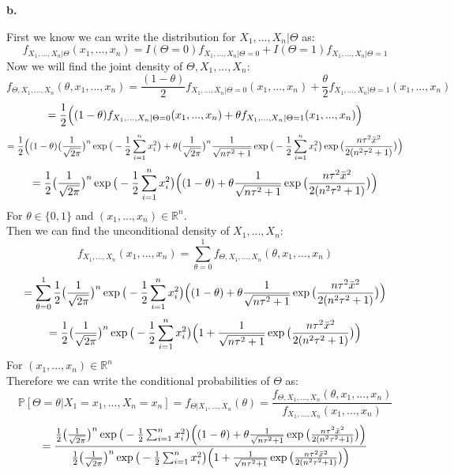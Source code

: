 \documentclass{article}
\begin{document}
\newpage
{\Large\textbf{b.}}
\begin{center}
\doublespacing
    First we know we can write the distribution for $X_1, ..., X_n |\Theta$ as:
    \[f_{X_1, ..., X_n |\Theta} (x_1, ..., x_n) = I(\Theta = 0) f_{X_1, ..., X_n |\Theta = 0} + I(\Theta = 1) f_{X_1, ..., X_n |\Theta = 1}\]
    Now we will find the joint density of $\Theta, X_1, ..., X_n$:
    \[f_{\Theta, X_1, ..., X_n} (\theta, x_1, ..., x_n) = \frac{(1 -\theta)}{2} f_{X_1, ..., X_n |\Theta = 0} (x_1, ..., x_n) +\frac{\theta}{2} f_{X_1, ..., X_n |\Theta = 1} (x_1, ..., x_n)\]
    \[=\frac{1}{2}\Big{(}(1 -\theta) f_{X_1, ..., X_n |\Theta = 0} (x_1, ..., x_n) +\theta f_{X_1, ..., X_n |\Theta = 1} (x_1, ..., x_n)\Big{)}\]
    \[=\frac{1}{2}\Big{(}(1 -\theta)\big{(}\frac{1}{\sqrt{2\pi}}\big{)}^n\exp{\big{(}-\frac{1}{2}\sum_{i=1}^n x_i^2\big{)}} +\theta\big{(}\frac{1}{\sqrt{2\pi}}\big{)}^n\frac{1}{\sqrt{n\tau^2 + 1}}\exp{\big{(}-\frac{1}{2}\sum_{i=1}^n x_i^2\big{)}}\exp{\big{(}\frac{n\tau^2\Bar{x}^2}{2(n^2\tau^2 + 1)}\big{)}}\Big{)}\]
    \[=\frac{1}{2}\big{(}\frac{1}{\sqrt{2\pi}}\big{)}^n\exp{\big{(}-\frac{1}{2}\sum_{i=1}^n x_i^2\big{)}}\Big{(}(1 -\theta) +\theta\frac{1}{\sqrt{n\tau^2 + 1}}\exp{\big{(}\frac{n\tau^2\Bar{x}^2}{2(n^2\tau^2 + 1)}\big{)}}\Big{)}\]
    For $\theta\in\{0, 1\}$ and $(x_1, ..., x_n)\in\mathbb{R}^n$.
    \\Then we can find the unconditional density of $X_1, ..., X_n$:
    \[f_{X_1, ..., X_n} (x_1, ..., x_n) =\sum_{\theta = 0}^1 f_{\Theta, X_1, ..., X_n} (\theta, x_1, ..., x_n)\]
    \[=\sum_{\theta = 0}^1\frac{1}{2}\big{(}\frac{1}{\sqrt{2\pi}}\big{)}^n\exp{\big{(}-\frac{1}{2}\sum_{i=1}^n x_i^2\big{)}}\Big{(}(1 -\theta) +\theta\frac{1}{\sqrt{n\tau^2 + 1}}\exp{\big{(}\frac{n\tau^2\Bar{x}^2}{2(n^2\tau^2 + 1)}\big{)}}\Big{)}\]
    \[=\frac{1}{2}\big{(}\frac{1}{\sqrt{2\pi}}\big{)}^n\exp{\big{(}-\frac{1}{2}\sum_{i=1}^n x_i^2\big{)}}\Big{(}1 +\frac{1}{\sqrt{n\tau^2 + 1}}\exp{\big{(}\frac{n\tau^2\Bar{x}^2}{2(n^2\tau^2 + 1)}\big{)}}\Big{)}\]
    For $(x_1, ..., x_n)\in\mathbb{R}^n$
    \\Therefore we can write the conditional probabilities of $\Theta$ as:
    \[\mathbb{P}[\Theta =\theta | X_1 = x_1, ..., X_n = x_n] = f_{\Theta | X_1, ..., X_n} (\theta) =\frac{f_{\Theta, X_1, ..., X_n} (\theta, x_1, ..., x_n)}{f_{X_1, ..., X_n} (x_1, ..., x_n)}\]
    \[=\frac{\frac{1}{2}\big{(}\frac{1}{\sqrt{2\pi}}\big{)}^n\exp{\big{(}-\frac{1}{2}\sum_{i=1}^n x_i^2\big{)}}\Big{(}(1 -\theta) +\theta\frac{1}{\sqrt{n\tau^2 + 1}}\exp{\big{(}\frac{n\tau^2\Bar{x}^2}{2(n^2\tau^2 + 1)}\big{)}}\Big{)}}{\frac{1}{2}\big{(}\frac{1}{\sqrt{2\pi}}\big{)}^n\exp{\big{(}-\frac{1}{2}\sum_{i=1}^n x_i^2\big{)}}\Big{(}1 +\frac{1}{\sqrt{n\tau^2 + 1}}\exp{\big{(}\frac{n\tau^2\Bar{x}^2}{2(n^2\tau^2 + 1)}\big{)}}\Big{)}}\]

\end{center}
\end{document}
